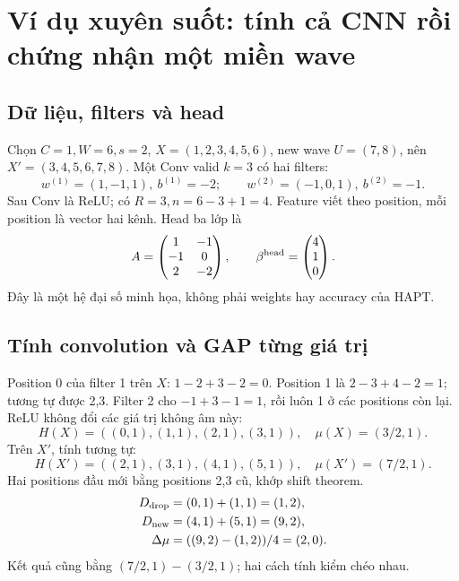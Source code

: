 \documentclass[11pt,a4paper]{article}
\theoremstyle{definition}
\begin{document}
\section{Ví dụ xuyên suốt: tính cả CNN rồi chứng nhận một miền wave}
\subsection{Dữ liệu, filters và head}
Chọn $C=1,W=6,s=2$, $X=(1,2,3,4,5,6)$, new wave $U=(7,8)$, nên
$X'=(3,4,5,6,7,8)$. Một Conv valid $k=3$ có hai filters:
\begin{equation}
w^{(1)}=(1,-1,1),\ b^{(1)}=-2;\qquad
w^{(2)}=(-1,0,1),\ b^{(2)}=-1.
\end{equation}
Sau Conv là ReLU; có $R=3,n=6-3+1=4$. Feature viết theo position, mỗi
position là vector hai kênh. Head ba lớp là
\begin{equation}
A=\begin{pmatrix}1&-1\\-1&0\\2&-2\end{pmatrix},\qquad
\beta^{\rm head}=\begin{pmatrix}4\\1\\0\end{pmatrix}.
\end{equation}
Đây là một hệ đại số minh họa, không phải weights hay accuracy của HAPT.

\subsection{Tính convolution và GAP từng giá trị}
Position 0 của filter 1 trên $X$: $1-2+3-2=0$. Position 1 là
$2-3+4-2=1$; tương tự được 2,3. Filter 2 cho
$-1+3-1=1$, rồi luôn 1 ở các positions còn lại. ReLU không đổi các giá trị
không âm này:
\begin{equation}
H(X)=((0,1),(1,1),(2,1),(3,1)),\quad\mu(X)=(3/2,1).
\end{equation}
Trên $X'$, tính tương tự:
\begin{equation}
H(X')=((2,1),(3,1),(4,1),(5,1)),\quad\mu(X')=(7/2,1).
\end{equation}
Hai positions đầu mới bằng positions 2,3 cũ, khớp shift theorem.
\begin{align}
D_{\rm drop}&=(0,1)+(1,1)=(1,2),\\
D_{\rm new}&=(4,1)+(5,1)=(9,2),\\
\Delta\mu&=((9,2)-(1,2))/4=(2,0).
\end{align}
Kết quả cũng bằng $(7/2,1)-(3/2,1)$; hai cách tính kiểm chéo nhau.
\end{document}
